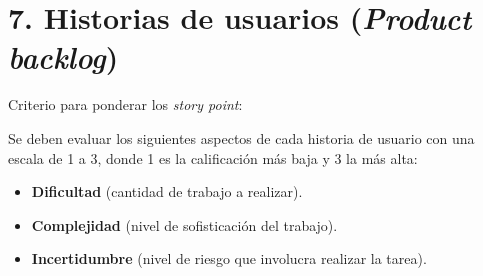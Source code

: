 \documentclass[
11pt, %
codirector, %
]{charter}
\begin{document}
%
%
%
%
%
%

\section{7. Historias de usuarios (\textit{Product backlog})}
\label{sec:backlog}

Criterio para ponderar los \textit{story point}: 

Se deben evaluar los siguientes aspectos de cada historia de usuario con una escala de 1 a 3, donde 1 es la calificación más baja y 3 la más alta:
\begin{itemize}
	\item \textbf{Dificultad} (cantidad de trabajo a realizar).
	\item \textbf{Complejidad} (nivel de sofisticación del trabajo).
	\item \textbf{Incertidumbre} (nivel de riesgo que involucra realizar la tarea).
\end{itemize}	
\end{document}
